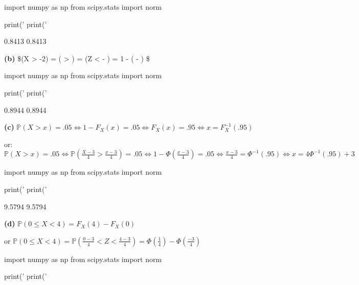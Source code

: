 \begin{python}
import numpy as np
from scipy.stats import norm

print('%
print('%
\end{python}

\begin{console}
0.8413
0.8413
\end{console}

\textbf{(b)} \$(X \textgreater{} -2) =
\left( \textgreater{}  \right)
= \left(Z \textless{} - \right) = 1 - \Phi\left(
- \right) \$

\begin{python}
import numpy as np
from scipy.stats import norm

print('%
print('%
\end{python}

\begin{console}
0.8944
0.8944
\end{console}

\textbf{(c)} \(\mathbb{P}(X > x) = .05
\Longleftrightarrow 1 - F_X(x) = .05
\Longleftrightarrow F_X(x) = .95
\Longleftrightarrow x = F_X^{-1}(.95)\)

or: \(\mathbb{P}(X > x) = .05
\Longleftrightarrow \mathbb{P}\left(\frac{X - 3}{4} > \frac{x - 3}{4}\right) = .05
\Longleftrightarrow 1 - \Phi\left(\frac{x - 3}{4}\right) = .05
\Longleftrightarrow \frac{x - 3}{4} = \Phi^{-1}(.95)
\Longleftrightarrow x = 4 \Phi^{-1}(.95) + 3\)

\begin{python}
import numpy as np
from scipy.stats import norm

print('%
print('%
\end{python}

\begin{console}
9.5794
9.5794
\end{console}

\textbf{(d)} \(\mathbb{P}(0 \leq X < 4) = F_X(4) - F_X(0)\)

or
\(\mathbb{P}(0 \leq X < 4) = \mathbb{P}\left(\frac{0 - 3}{4} < Z < \frac{4 - 3}{4} \right) = \Phi\left( \frac{1}{4} \right) - \Phi\left( \frac{-3}{4} \right)\)

\begin{python}
import numpy as np
from scipy.stats import norm

print('%
print('%
\end{python}

